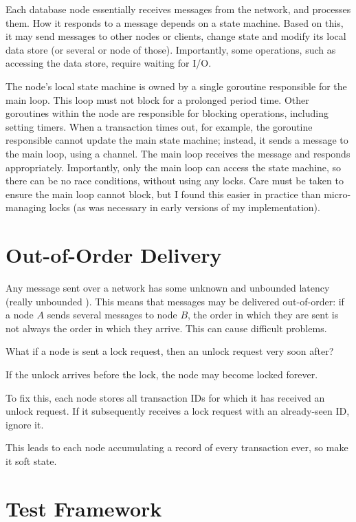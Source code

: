 \documentclass[12pt,a4paper,twoside,openany]{report}
\begin{document}
Each database node essentially receives messages from the network, and processes them. How it responds to a message depends on a state machine. Based on this, it may send messages to other nodes or clients, change state and modify its local data store (or several or node of those). Importantly, some operations, such as accessing the data store, require waiting for I/O.

The node's local state machine is owned by a single goroutine responsible for the main loop. This loop must not block for a prolonged period time. Other goroutines within the node are responsible for blocking operations, including setting timers. When a transaction times out, for example, the goroutine responsible cannot update the main state machine; instead, it sends a message to the main loop, using a channel. The main loop receives the message and responds appropriately. Importantly, only the main loop can access the state machine, so there can be no race conditions, without using any locks. Care must be taken to ensure the main loop cannot block, but I found this easier in practice than micro-managing locks (as was necessary in early versions of my implementation).

\section{Out-of-Order Delivery}

Any message sent over a network has some unknown and unbounded latency (really unbounded \cite{imbriaco_2012}). This means that messages may be delivered out-of-order: if a node $A$ sends several messages to node $B$, the order in which they are sent is not always the order in which they arrive. This can cause difficult problems.

What if a node is sent a lock request, then an unlock request very soon after?

If the unlock arrives before the lock, the node may become locked forever.

To fix this, each node stores all transaction IDs for which it has received an unlock request. If it subsequently receives a lock request with an already-seen ID, ignore it.

This leads to each node accumulating a record of every transaction ever, so make it soft state.


\section{Test Framework}
\end{document}
